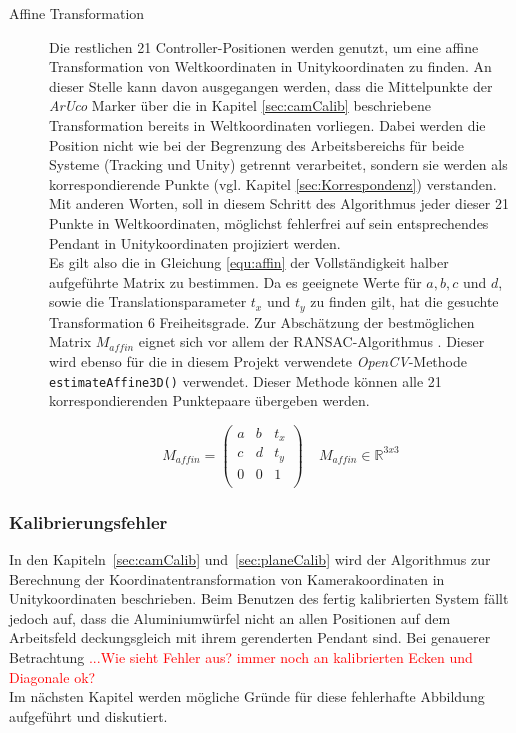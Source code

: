 \begin{description}
\item[Affine Transformation] Die restlichen 21 Controller-Positionen werden genutzt, um eine affine Transformation von Weltkoordinaten in Unitykoordinaten zu finden. An dieser Stelle kann davon ausgegangen werden, dass die Mittelpunkte der \textit{ArUco} Marker über die in Kapitel \ref{sec:camCalib} beschriebene Transformation bereits in Weltkoordinaten vorliegen. Dabei werden die Position nicht wie bei der Begrenzung des Arbeitsbereichs für beide Systeme (Tracking und Unity) getrennt verarbeitet, sondern sie werden als korrespondierende Punkte (vgl. Kapitel \ref{sec:Korrespondenz}) verstanden. Mit anderen Worten, soll in diesem Schritt des Algorithmus jeder dieser 21 Punkte in Weltkoordinaten, möglichst fehlerfrei auf sein entsprechendes Pendant in Unitykoordinaten projiziert werden. \\
Es gilt also die in Gleichung \ref{equ:affin} der Vollständigkeit halber aufgeführte Matrix zu bestimmen. Da es geeignete Werte für $a, b, c$ und $d$, sowie die Translationsparameter $t_x$ und $t_y$ zu finden gilt, hat die gesuchte Transformation 6 Freiheitsgrade. Zur Abschätzung der bestmöglichen Matrix $M_{affin}$ eignet sich vor allem der RANSAC-Algorithmus \cite{articel:RANSAC}. Dieser wird ebenso für die in diesem Projekt verwendete \textit{OpenCV}-Methode \texttt{estimateAffine3D()} verwendet. Dieser Methode können alle 21 korrespondierenden Punktepaare übergeben werden. 

\begin{equation}
\label{equ:affin}
M_{affin} = 
\begin{pmatrix}
a & b & t_x \\
c & d & t_y \\
0 & 0 & 1  \\
\end{pmatrix} 
~ ~ ~ ~ ~M_{affin} \in \mathbb{R}^{3x3}
\end{equation}
\end{description}

\subsubsection{Kalibrierungsfehler} \label{sec:calibError}
In den Kapiteln~\ref{sec:camCalib} und~\ref{sec:planeCalib} wird der Algorithmus zur Berechnung der Koordinatentransformation von Kamerakoordinaten in Unitykoordinaten beschrieben. Beim Benutzen des fertig kalibrierten System fällt jedoch auf, dass die Aluminiumwürfel nicht an allen Positionen auf dem Arbeitsfeld deckungsgleich mit ihrem gerenderten Pendant sind.  Bei genauerer Betrachtung \textcolor{red}{...Wie sieht Fehler aus? immer noch an kalibrierten Ecken und Diagonale ok?}\\
Im nächsten Kapitel werden mögliche Gründe für diese fehlerhafte Abbildung aufgeführt und diskutiert. 


